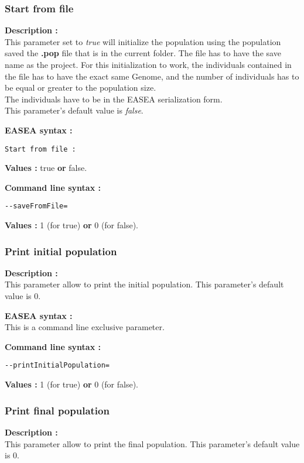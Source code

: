 \documentclass{book}
\begin{document}
\subsubsection{Start from file}\label{start-from-file}

\textbf{Description :}\\This parameter set to \emph{true} will
initialize the population using the population saved the \textbf{.pop}
file that is in the current folder. The file has to have the save name
as the project. For this initialization to work, the individuals
contained in the file has to have the exact same Genome, and the number
of individuals has to be equal or greater to the population size.\\The
individuals have to be in the EASEA serialization form.\\This
parameter's default value is \emph{false}.

\textbf{EASEA syntax :}

\texttt{Start~from~file~:}

\textbf{Values :} true \textbf{or} false.

\textbf{Command line syntax :}

\texttt{-{}-saveFromFile=}

\textbf{Values :} 1 (for true) \textbf{or} 0 (for false).

\subsubsection{Print initial population}\label{print-initial-population}

\textbf{Description :}\\This parameter allow to print the initial
population. This parameter's default value is 0.

\textbf{EASEA syntax :}\\This is a command line exclusive parameter.

\textbf{Command line syntax :}

\texttt{-{}-printInitialPopulation=}

\textbf{Values :} 1 (for true) \textbf{or} 0 (for false).

\subsubsection{Print final population}\label{print-final-population}

\textbf{Description :}\\This parameter allow to print the final
population. This parameter's default value is 0.
\end{document}
